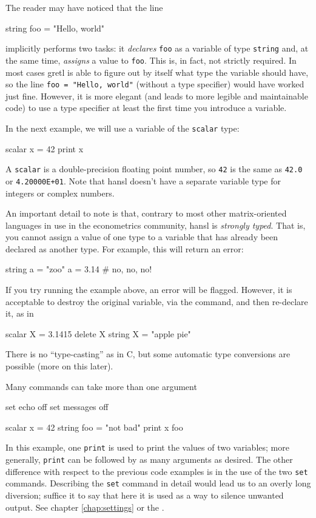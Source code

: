 The reader may have noticed that the line 
\begin{code}
  string foo = "Hello, world"
\end{code}
implicitly performs two tasks: it \emph{declares} \texttt{foo} as a
variable of type \texttt{string} and, at the same time, \emph{assigns}
a value to \texttt{foo}. This is, in fact, not strictly required.  In
most cases gretl is able to figure out by itself what type the
variable should have, so the line \verb|foo = "Hello, world"| (without
a type specifier) would have worked just fine.  However, it is more
elegant (and leads to more legible and maintainable code) to use a
type specifier at least the first time you introduce a variable.
  
In the next example, we will use a variable of the \texttt{scalar}
type:
\begin{code}
  scalar x = 42
  print x
\end{code}
A \texttt{scalar} is a double-precision floating point number, so
\texttt{42} is the same as \texttt{42.0} or \texttt{4.20000E+01}. Note
that hansl doesn't have a separate variable type for integers or
complex numbers.

An important detail to note is that, contrary to most other
matrix-oriented languages in use in the econometrics community, hansl
is \emph{strongly typed}. That is, you cannot assign a value of one
type to a variable that has already been declared as another type. For
example, this will return an error:
\begin{code}
  string a = "zoo"
  a = 3.14 # no, no, no!
\end{code}
If you try running the example above, an error will be
flagged. However, it is acceptable to destroy the original variable,
via the  command, and then re-declare it, as in
\begin{code}
  scalar X = 3.1415
  delete X
  string X = "apple pie"
\end{code}

There is no ``type-casting'' as in C, but some automatic type
conversions are possible (more on this later).

Many commands can take more than one argument
\begin{code}
  set echo off
  set messages off

  scalar x = 42
  string foo = "not bad"
  print x foo 
\end{code}
In this example, one \texttt{print} is used to print the values of two
variables; more generally, \texttt{print} can be followed by as many
arguments as desired. The other difference with respect to the
previous code examples is in the use of the two \texttt{set}
commands. Describing the \texttt{set} command in detail would lead us
to an overly long diversion; suffice it to say that here it is used as
a way to silence unwanted output. See chapter \ref{chap:settings} or
the \GCR{}.

